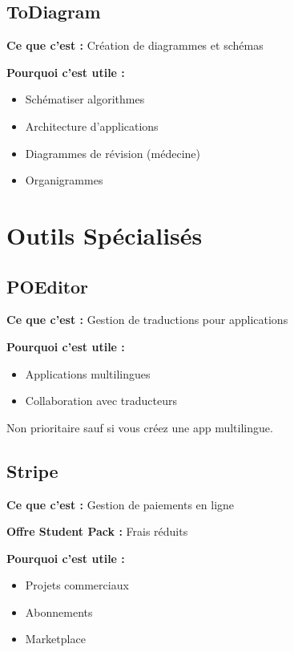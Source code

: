 \documentclass[11pt,a4paper]{article}
\begin{document}
\subsection{ToDiagram}

\textbf{Ce que c'est :} Création de diagrammes et schémas

\textbf{Pourquoi c'est utile :}
\begin{itemize}
    \item Schématiser algorithmes
    \item Architecture d'applications
    \item Diagrammes de révision (médecine)
    \item Organigrammes
\end{itemize}

\newpage
\section{Outils Spécialisés}

\subsection{POEditor}

\textbf{Ce que c'est :} Gestion de traductions pour applications

\textbf{Pourquoi c'est utile :}
\begin{itemize}
    \item Applications multilingues
    \item Collaboration avec traducteurs
\end{itemize}

\begin{conseil}
Non prioritaire sauf si vous créez une app multilingue.
\end{conseil}

\subsection{Stripe}

\textbf{Ce que c'est :} Gestion de paiements en ligne

\textbf{Offre Student Pack :} Frais réduits

\textbf{Pourquoi c'est utile :}
\begin{itemize}
    \item Projets commerciaux
    \item Abonnements
    \item Marketplace
\end{itemize}
\end{document}
